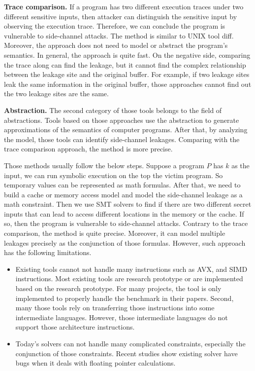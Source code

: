 \textbf{Trace comparison.} If a program has two different execution traces under two different sensitive inputs, then attacker can distinguish the sensitive input by observing the execution trace. Therefore, we can conclude the program is vulnerable to side-channel attacks. The method is similar to UNIX tool \textsf{diff}. Moreover, the approach does not need to model or abstract the program's semantics. In general, the approach is quite fast. On the negative side, comparing the trace along can find the leakage, but it cannot find the complex relationship between the leakage site and the original buffer. For example, if two leakage sites leak the same information in the original buffer, those approaches cannot find out the two leakage sites are the same.

\textbf{Abstraction.} The second category of those tools belongs to the field of abstractions. Tools based on those approaches use the abstraction to generate approximations of the semantics of computer programs. After that, by analyzing the model, those tools can identify side-channel leakages. Comparing with the trace comparison approach, the method is more precise.

Those methods usually follow the below steps. Suppose a program $P$ has $k$ as the input, we can run symbolic execution on the top the victim program. So temporary values can be represented as math formulas. After that, we need to build a cache or memory access model and model the side-channel leakage as a math constraint. Then we use SMT solvers to find if there are two different secret inputs that can lead to access different locations in the memory or the cache. If so, then the program is vulnerable to side-channel attacks. Contrary to the trace comparison, the method is quite precise. Moreover, it can model multiple leakages precisely as the conjunction of those formulas. However, such approach has the following limitations.

\begin{itemize}
    \item Existing tools cannot not handle many instructions such as AVX, and SIMD instructions.  Most existing tools are research prototype or are implemented based on the research prototype. For many projects, the tool is only implemented to properly handle the benchmark in their papers. Second, many those tools rely on transferring those instructions into some intermediate languages. However, those intermediate languages do not support those architecture instructions.
    \item Today's solvers can not handle many complicated constraints, especially the conjunction of those constraints. Recent studies show existing solver have bugs when it deals with floating pointer calculations.
\end{itemize}

